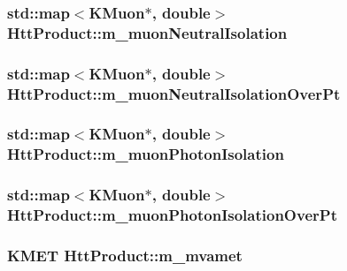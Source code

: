 \label{classHttProduct_aa378e6264b7559aa9e86a5aa691f60a7}
\hypertarget{classHttProduct_abdfa11aaba1b4edcba7715e68cf2aaca}{
\subsubsection[{m\_\-muonNeutralIsolation}]{\setlength{\rightskip}{0pt plus 5cm}std::map$<$KMuon$\ast$, double$>$ {\bf HttProduct::m\_\-muonNeutralIsolation}}}
\label{classHttProduct_abdfa11aaba1b4edcba7715e68cf2aaca}
\hypertarget{classHttProduct_ab1f969d8d977e78fe88e12ef315f6583}{
\subsubsection[{m\_\-muonNeutralIsolationOverPt}]{\setlength{\rightskip}{0pt plus 5cm}std::map$<$KMuon$\ast$, double$>$ {\bf HttProduct::m\_\-muonNeutralIsolationOverPt}}}
\label{classHttProduct_ab1f969d8d977e78fe88e12ef315f6583}
\hypertarget{classHttProduct_a5aa31ac41552608c176cb28a3e3c06f6}{
\subsubsection[{m\_\-muonPhotonIsolation}]{\setlength{\rightskip}{0pt plus 5cm}std::map$<$KMuon$\ast$, double$>$ {\bf HttProduct::m\_\-muonPhotonIsolation}}}
\label{classHttProduct_a5aa31ac41552608c176cb28a3e3c06f6}
\hypertarget{classHttProduct_aedf7aad859164dc7ec217ee3586d4d8b}{
\subsubsection[{m\_\-muonPhotonIsolationOverPt}]{\setlength{\rightskip}{0pt plus 5cm}std::map$<$KMuon$\ast$, double$>$ {\bf HttProduct::m\_\-muonPhotonIsolationOverPt}}}
\label{classHttProduct_aedf7aad859164dc7ec217ee3586d4d8b}
\hypertarget{classHttProduct_a44f387057d5dafe967b68fd5eb58a79f}{
\subsubsection[{m\_\-mvamet}]{\setlength{\rightskip}{0pt plus 5cm}KMET {\bf HttProduct::m\_\-mvamet}}}
